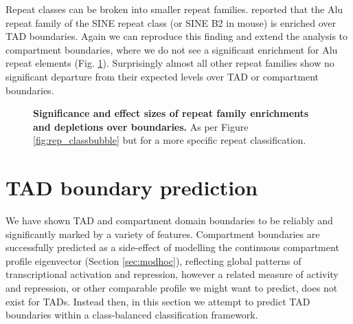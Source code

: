 \documentclass[a4paper,11pt,oneside]{book}
\begin{document}
Repeat classes can be broken into smaller repeat families. \citet{Dixon2012} reported that the Alu repeat family of the SINE repeat class (or SINE B2 in mouse) is enriched over TAD boundaries. Again we can reproduce this finding and extend the analysis to compartment boundaries, where we do not see a significant enrichment for Alu repeat elements (Fig. \ref{fig:rep_fambubble}). Surprisingly almost all other repeat families show no significant departure from their expected levels over TAD or compartment boundaries. 

\begin{figure}
\begin{center} 
\captionsetup{width=\textwidth}
\caption[Significance and effect sizes of repeat family enrichments and depletions over boundaries.]{ {\bf Significance and effect sizes of repeat family enrichments and depletions over boundaries.}
As per Figure \ref{fig:rep_classbubble} but for a more specific repeat classification.
}\label{fig:rep_fambubble}
\end{center}
\end{figure} 


\section{TAD boundary prediction}\label{sec:boundarypred}

We have shown TAD and compartment domain boundaries to be reliably and significantly marked by a variety of features. Compartment boundaries are successfully predicted as a side-effect of modelling the continuous compartment profile eigenvector (Section \ref{sec:modhoc}), reflecting global patterns of transcriptional activation and repression, however a related measure of activity and repression, or other comparable profile we might want to predict, does not exist for TADs. Instead then, in this section we attempt to predict TAD boundaries within a class-balanced classification framework.
\end{document}
